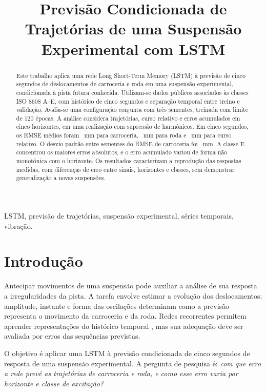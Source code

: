 \documentclass[conference]{IEEEtran}
\title{Previsão Condicionada de Trajetórias de uma Suspensão Experimental com LSTM}
\author{\IEEEauthorblockN{Pedro Druck Montalvão Reis}
\IEEEauthorblockA{Engenharia de Software\\Universidade de Brasília (UnB)\\Brasília, Brasil\\pedrodmreis@gmail.com}
\and\IEEEauthorblockN{Felipe Tedesco Horta}
\IEEEauthorblockA{Engenharia Automotiva\\Universidade de Brasília (UnB)\\Brasília, Brasil\\TedescoHF19@gmail.com}}
\begin{document}
\maketitle
\begin{abstract}
Este trabalho aplica uma rede Long Short-Term Memory (LSTM) à previsão de cinco segundos de deslocamentos de carroceria e roda em uma suspensão experimental, condicionada à pista futura conhecida. Utilizam-se dados públicos associados às classes ISO 8608 A--E, com histórico de cinco segundos e separação temporal entre treino e validação. Avalia-se uma configuração conjunta com três sementes, treinada com limite de 120 épocas. A análise considera trajetórias, curso relativo e erros acumulados em cinco horizontes, em uma realização com supressão de harmônicos. Em cinco segundos, os RMSE médios foram \BodyLSTMRMSE~mm para carroceria, \WheelLSTMRMSE~mm para roda e \StrokeLSTMRMSE~mm para curso relativo. O desvio padrão entre sementes do RMSE de carroceria foi \BodyLSTMRMSESD~mm. A classe E concentrou os maiores erros absolutos, e o erro acumulado variou de forma não monotônica com o horizonte. Os resultados caracterizam a reprodução das respostas medidas, com diferenças de erro entre sinais, horizontes e classes, sem demonstrar generalização a novas suspensões.

\end{abstract}
\begin{IEEEkeywords}
LSTM, previsão de trajetórias, suspensão experimental, séries temporais, vibração.
\end{IEEEkeywords}

\section{Introdução}
Antecipar movimentos de uma suspensão pode auxiliar a análise de sua resposta a irregularidades da pista. A tarefa envolve estimar a evolução dos deslocamentos: amplitude, instante e forma das oscilações determinam como a previsão representa o movimento da carroceria e da roda. Redes recorrentes permitem aprender representações do histórico temporal \cite{lstm,goodfellow}, mas sua adequação deve ser avaliada por erros das sequências previstas.

O objetivo é aplicar uma LSTM à previsão condicionada de cinco segundos de resposta de uma suspensão experimental. A pergunta de pesquisa é: \emph{com que erro a rede prevê as trajetórias de carroceria e roda, e como esse erro varia por horizonte e classe de excitação?}
\end{document}
